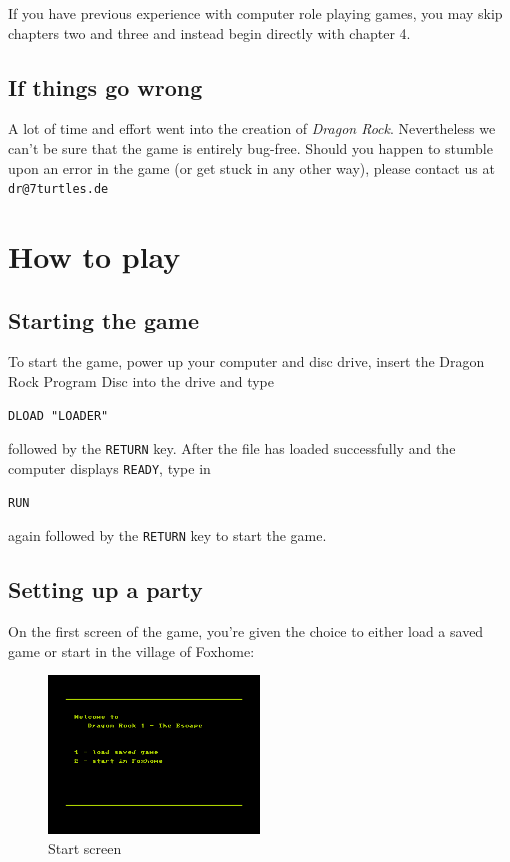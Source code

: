 \documentclass[12pt]{scrbook}
\begin{document}
If you have previous experience with computer role playing games, you may skip chapters two and three and instead begin directly with chapter 4. 

\section*{If things go wrong}
A lot of time and effort went into the creation of \textit{Dragon Rock}. Nevertheless we can't be sure that the game is entirely bug-free. Should you happen to stumble upon an error in the game (or get stuck in any other way), please contact us at \texttt{dr@7turtles.de}


\chapter{How to play}

\section*{Starting the game}
To start the game, power up your computer and disc drive, insert the Dragon Rock Program Disc into the drive and type
\begin{verbatim}
DLOAD "LOADER"
\end{verbatim}
followed by the \texttt{RETURN} key. After the file has loaded successfully and the computer displays \texttt{READY}, type in
\begin{verbatim}
RUN
\end{verbatim}
again followed by the \texttt{RETURN} key to start the game.

\section*{Setting up a party}
On the first screen of the game, you're given the choice to either load a saved game or start in the village of Foxhome:

\begin{figure}[ht]
    \centering
    \includegraphics[width=0.5\textwidth]{startscreen}
    \caption{Start screen}
\end{figure}
\end{document}
